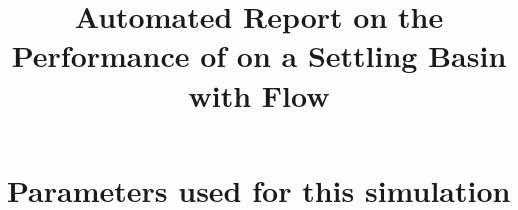 \documentclass[11pt,a4paper]{article}%
\begin{document}
 

\title{Automated Report on the Performance of \anuga{} on a Settling Basin with Flow}
\maketitle




\section{Parameters used for this simulation}






\end{document}
